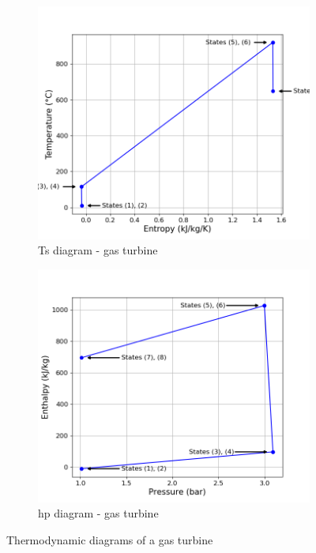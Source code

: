 \begin{figure}[h]
     \centering
     \begin{subfigure}[b]{0.4\textwidth}
         \centering
         \includegraphics[width=\textwidth]{Ts_GT}
         \caption{Ts diagram - gas turbine}
         \label{fig:C5_Ts_GT}
     \end{subfigure}
     \begin{subfigure}[b]{0.4\textwidth}
         \centering
         \includegraphics[width=\textwidth]{hp_GT}
         \caption{hp diagram - gas turbine}
         \label{fig:C5_hp_GT}
     \end{subfigure}
        \caption{Thermodynamic diagrams of a gas turbine}
        \label{fig:C5_thermo_diagram_GT}
\end{figure}\newpage


